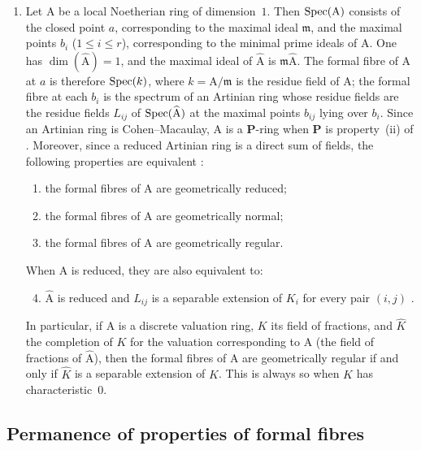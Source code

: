 \begin{remarks}[7.3.19]
\begin{enumerate}[label=\emph{\roman*)}]
  \item Let $\mathrm{A}$ be a local Noetherian ring of dimension~$1$.
  Then $\operatorname{Spec}(\mathrm{A})$ consists of the closed point $a$, corresponding to the maximal ideal $\mathfrak{m}$, and the maximal points $b_i$ ($1\leqslant i\leqslant r$), corresponding to the minimal prime ideals of $\mathrm{A}$.
  One has $\dim(\widehat{\mathrm{A}})=1$, and the maximal ideal of $\widehat{\mathrm{A}}$ is $\mathfrak{m}\widehat{\mathrm{A}}$.
  The formal fibre of $\mathrm{A}$ at $a$ is therefore $\operatorname{Spec}(k)$, where $k=\mathrm{A}/\mathfrak{m}$ is the residue field of $\mathrm{A}$; the formal fibre at each $b_i$ is the spectrum of an Artinian ring whose residue fields are the residue fields $L_{ij}$ of $\operatorname{Spec}(\widehat{\mathrm{A}})$ at the maximal points $b_{ij}$ lying over $b_i$.
  Since an Artinian ring is Cohen--Macaulay, $\mathrm{A}$ is a $\boldsymbol{P}$-ring when $\boldsymbol{P}$ is property~(ii) of .
  Moreover, since a reduced Artinian ring is a direct sum of fields, the following properties are equivalent :
  \begin{enumerate}[label=\emph{\alph*)}]
    \item the formal fibres of $\mathrm{A}$ are geometrically reduced;
    \item the formal fibres of $\mathrm{A}$ are geometrically normal;
    \item the formal fibres of $\mathrm{A}$ are geometrically regular.
  \end{enumerate}
  When $\mathrm{A}$ is reduced, they are also equivalent to:
  \begin{enumerate}[label=\emph{\alph*)}]
    \setcounter{enumii}{3}
    \item $\widehat{\mathrm{A}}$ is reduced and $L_{ij}$ is a separable extension of $K_i$ for every pair $(i,j)$ .
  \end{enumerate}
  In particular, if $\mathrm{A}$ is a discrete valuation ring, $K$ its field of fractions, and $\widehat{K}$ the completion of $K$ for the valuation corresponding to $\mathrm{A}$ (the field of fractions of $\widehat{\mathrm{A}}$), then the formal fibres of $\mathrm{A}$ are geometrically regular if and only if $\widehat{K}$ is a separable extension of $K$.
  This is always so when $K$ has characteristic~$0$.
\end{enumerate}
\end{remarks}


\newpage %
\subsection{Permanence of properties of formal fibres}
\label{subsection:IV.7.4}

